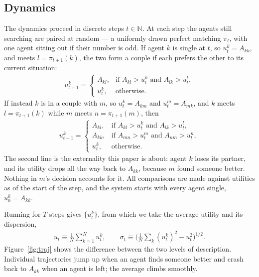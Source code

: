 \documentclass[sigconf,anonymous]{aamas}
\begin{document}
\subsection{Dynamics}
\label{sec:dynamics}

The dynamics proceed in discrete steps $t \in \mathbb{N}$. At each step the
agents still searching are paired at random --- a uniformly drawn perfect
matching $\pi_t$, with one agent sitting out if their number is odd. If agent
$k$ is single at $t$, so $u_t^k = A_{kk}$, and meets $l = \pi_{t+1}(k)$, the two
form a couple if each prefers the other to its current situation:
%
\begin{align}
  u_{t+1}^k = \begin{cases}
    A_{kl}, & \text{if } A_{kl} > u_t^k \text{ and } A_{lk} > u_t^l,\\
    u_t^k, & \text{otherwise}.
  \end{cases}
  \label{eq:single}
\end{align}
%
If instead $k$ is in a couple with $m$, so $u_t^k = A_{km}$ and
$u_t^m = A_{mk}$, and $k$ meets $l = \pi_{t+1}(k)$ while $m$ meets
$n = \pi_{t+1}(m)$, then
%
\begin{align}
  u_{t+1}^k = \begin{cases}
    A_{kl}, & \text{if } A_{kl} > u_t^k \text{ and } A_{lk} > u_t^l,\\
    A_{kk}, & \text{if } A_{mn} > u_t^m \text{ and } A_{nm} > u_t^n,\\
    u_t^k, & \text{otherwise}.
  \end{cases}
  \label{eq:couple}
\end{align}
%
The second line is the externality this paper is about: agent $k$ loses its
partner, and its utility drops all the way back to $A_{kk}$, because $m$ found
someone better. Nothing in $m$'s decision accounts for it. All comparisons are
made against utilities as of the start of the step, and the system starts with
every agent single, $u_0^k = A_{kk}$.

Running for $T$ steps gives $\{u_t^k\}$, from which we take the average utility
and its dispersion,
%
\begin{align}
  u_t \equiv \frac{1}{N}\sum_{k=1}^N u_t^k,
  \qquad
  \sigma_t \equiv \Big(\tfrac{1}{N}\textstyle\sum_k (u_t^k)^2 - u_t^2\Big)^{1/2}.
\end{align}
%
Figure~\ref{fig:traj} shows the difference between the two levels of
description. Individual trajectories jump up when an agent finds someone better
and crash back to $A_{kk}$ when an agent is left; the average climbs smoothly.
\end{document}
